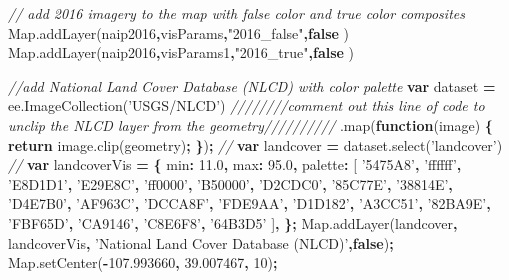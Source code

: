 \documentclass[]{article}
\newenvironment{Shaded}{\begin{snugshade}}{\end{snugshade}}
\newcommand{\KeywordTok}[1]{\textcolor[rgb]{0.13,0.29,0.53}{\textbf{#1}}}
\newcommand{\DataTypeTok}[1]{\textcolor[rgb]{0.13,0.29,0.53}{#1}}
\newcommand{\DecValTok}[1]{\textcolor[rgb]{0.00,0.00,0.81}{#1}}
\newcommand{\FloatTok}[1]{\textcolor[rgb]{0.00,0.00,0.81}{#1}}
\newcommand{\StringTok}[1]{\textcolor[rgb]{0.31,0.60,0.02}{#1}}
\newcommand{\CommentTok}[1]{\textcolor[rgb]{0.56,0.35,0.01}{\textit{#1}}}
\newcommand{\VariableTok}[1]{\textcolor[rgb]{0.00,0.00,0.00}{#1}}
\newcommand{\ControlFlowTok}[1]{\textcolor[rgb]{0.13,0.29,0.53}{\textbf{#1}}}
\newcommand{\OperatorTok}[1]{\textcolor[rgb]{0.81,0.36,0.00}{\textbf{#1}}}
\newcommand{\AttributeTok}[1]{\textcolor[rgb]{0.77,0.63,0.00}{#1}}
\newcommand{\NormalTok}[1]{#1}
\begin{document}
\begin{Shaded}
\begin{Highlighting}[]
\CommentTok{// add 2016 imagery to the map with false color and true color composites}
\VariableTok{Map}\NormalTok{.}\AttributeTok{addLayer}\NormalTok{(naip2016}\OperatorTok{,}\NormalTok{visParams}\OperatorTok{,}\StringTok{"2016_false"}\OperatorTok{,}\KeywordTok{false}\NormalTok{ )}
\VariableTok{Map}\NormalTok{.}\AttributeTok{addLayer}\NormalTok{(naip2016}\OperatorTok{,}\NormalTok{visParams1}\OperatorTok{,}\StringTok{"2016_true"}\OperatorTok{,}\KeywordTok{false}\NormalTok{ )}

\CommentTok{//add National Land Cover Database (NLCD) with color palette}
\KeywordTok{var}\NormalTok{ dataset }\OperatorTok{=} \VariableTok{ee}\NormalTok{.}\AttributeTok{ImageCollection}\NormalTok{(}\StringTok{'USGS/NLCD'}\NormalTok{)}
\CommentTok{////////comment out this line of code to unclip the NLCD layer from the geometry//////////}
\NormalTok{  .}\AttributeTok{map}\NormalTok{(}\KeywordTok{function}\NormalTok{(image) }\OperatorTok{\{} \ControlFlowTok{return} \VariableTok{image}\NormalTok{.}\AttributeTok{clip}\NormalTok{(geometry)}\OperatorTok{;} \OperatorTok{\}}\NormalTok{)}\OperatorTok{;}
\CommentTok{//}
\KeywordTok{var}\NormalTok{ landcover }\OperatorTok{=} \VariableTok{dataset}\NormalTok{.}\AttributeTok{select}\NormalTok{(}\StringTok{'landcover'}\NormalTok{)}
\CommentTok{//}
\KeywordTok{var}\NormalTok{ landcoverVis }\OperatorTok{=} \OperatorTok{\{}
  \DataTypeTok{min}\OperatorTok{:} \FloatTok{11.0}\OperatorTok{,}
  \DataTypeTok{max}\OperatorTok{:} \FloatTok{95.0}\OperatorTok{,}
  \DataTypeTok{palette}\OperatorTok{:}\NormalTok{ [}
    \StringTok{'5475A8'}\OperatorTok{,} \StringTok{'ffffff'}\OperatorTok{,} \StringTok{'E8D1D1'}\OperatorTok{,} \StringTok{'E29E8C'}\OperatorTok{,} \StringTok{'ff0000'}\OperatorTok{,} \StringTok{'B50000'}\OperatorTok{,} \StringTok{'D2CDC0'}\OperatorTok{,}
    \StringTok{'85C77E'}\OperatorTok{,} \StringTok{'38814E'}\OperatorTok{,} \StringTok{'D4E7B0'}\OperatorTok{,} \StringTok{'AF963C'}\OperatorTok{,} \StringTok{'DCCA8F'}\OperatorTok{,} \StringTok{'FDE9AA'}\OperatorTok{,} \StringTok{'D1D182'}\OperatorTok{,}
    \StringTok{'A3CC51'}\OperatorTok{,} \StringTok{'82BA9E'}\OperatorTok{,} \StringTok{'FBF65D'}\OperatorTok{,} \StringTok{'CA9146'}\OperatorTok{,} \StringTok{'C8E6F8'}\OperatorTok{,} \StringTok{'64B3D5'}
\NormalTok{  ]}\OperatorTok{,}
\OperatorTok{\};}
\VariableTok{Map}\NormalTok{.}\AttributeTok{addLayer}\NormalTok{(landcover}\OperatorTok{,}\NormalTok{ landcoverVis}\OperatorTok{,} \StringTok{'National Land Cover Database (NLCD)'}\OperatorTok{,}\KeywordTok{false}\NormalTok{)}\OperatorTok{;}
\VariableTok{Map}\NormalTok{.}\AttributeTok{setCenter}\NormalTok{(}\OperatorTok{-}\FloatTok{107.993660}\OperatorTok{,} \FloatTok{39.007467}\OperatorTok{,} \DecValTok{10}\NormalTok{)}\OperatorTok{;}

\end{Highlighting}
\end{Shaded}
\end{document}
